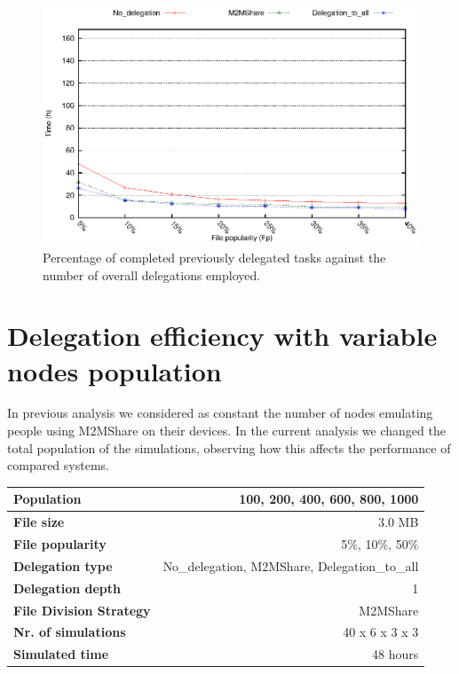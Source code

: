 \begin{figure}[ht]
  \begin{center}
    \includegraphics[scale=0.5]{grafici/tempiVFDiversaPop.eps}
    \caption{Percentage of completed previously delegated tasks against the number of overall delegations employed.}
    \label{graficoPopVariabile}
  \end{center}
\end{figure}


\newpage
\section{Delegation efficiency with variable nodes population}
In previous analysis we considered as constant the number of nodes emulating people using M2MShare on their devices. In the current analysis we changed the total population of the simulations, observing how this affects the performance of compared systems.
\begin{table}[h]
\begin{center}
\begin{tabular}{|l|r|}
\hline
\bfseries Population & 100, 200, 400, 600, 800, 1000 \\
\hline
\bfseries File size & 3.0 MB \\
\hline
\bfseries File popularity & 5\%, 10\%, 50\% \\
\hline
\bfseries Delegation type & No\_delegation, M2MShare, Delegation\_to\_all \\
\hline
\bfseries Delegation depth & 1 \\
\hline
\bfseries File Division Strategy & M2MShare \\
\hline
\bfseries Nr. of simulations & 40 x 6 x 3 x 3\\
\hline
\bfseries Simulated time & 48 hours \\
\hline
\end{tabular}
\end{center}
\end{table}

